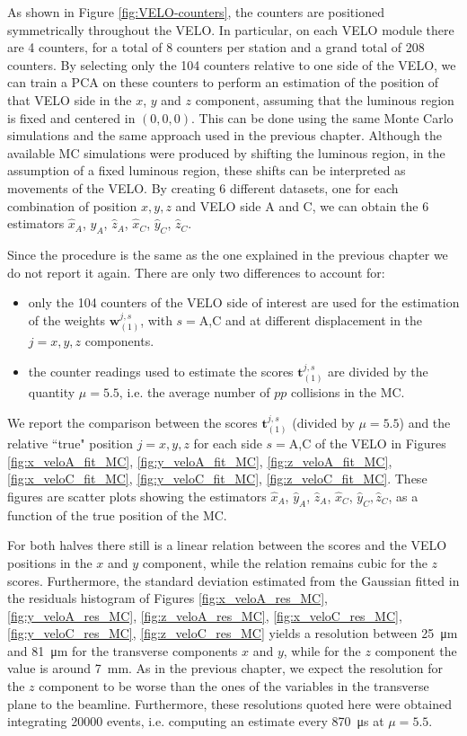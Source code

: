As shown in Figure \ref{fig:VELO-counters}, the counters are positioned symmetrically throughout the VELO. In particular, on each VELO module there are 4 counters, for a total of 8 counters per station and a grand total of 208 counters. By selecting only the 104 counters relative to one side of the VELO, we can train a PCA on these counters to perform an estimation of the position of that VELO side in the $x$, $y$ and $z$ component, assuming that the luminous region is fixed and centered in $(0,0,0)$. This can be done using the same Monte Carlo simulations and the same approach used in the previous chapter. Although the available MC simulations were produced by shifting the luminous region, in the assumption of a fixed luminous region, these shifts can be interpreted as movements of the VELO. By creating 6 different datasets, one for each combination of position $x,y,z$ and VELO side A and C, we can obtain the 6 estimators $\hat{x}_A$, $\hat{y}_A$, $\hat{z}_A$, $\hat{x}_C$, $\hat{y}_C$, $\hat{z}_C$.  

Since the procedure is the same as the one explained in the previous chapter we do not report it again. There are only two differences to account for:
\begin{itemize}
    \item only the 104 counters of the VELO side of interest are used for the estimation of the weights $\mathbf{w}^{j,s}_{(1)}$, with $s=$A,C and at different displacement in the $j=x,y,z$ components.
    \item the counter readings used to estimate the scores $\mathbf{t}^{j,s}_{(1)}$ are divided by the quantity $\mu=5.5$, i.e. the average number of $pp$ collisions in the MC.
\end{itemize}
We report the comparison between the scores $\mathbf{t}^{j,s}_{(1)}$ (divided by $\mu=5.5$) and the relative ``true" position $j=x,y,z$ for each side $s=$A,C of the VELO in Figures \ref{fig:x_veloA_fit_MC}, \ref{fig:y_veloA_fit_MC}, \ref{fig:z_veloA_fit_MC}, \ref{fig:x_veloC_fit_MC}, \ref{fig:y_veloC_fit_MC}, \ref{fig:z_veloC_fit_MC}. These figures are scatter plots showing the estimators $\hat{x}_A$, $\hat{y}_A$, $\hat{z}_A$, $\hat{x}_C$, $\hat{y}_C$$, \hat{z}_C$,  as a function of the true position of the MC.

For both halves there still is a linear relation between the scores and the VELO positions in the $x$ and $y$ component, while the relation remains cubic for the $z$ scores.  Furthermore, the standard deviation estimated from the Gaussian fitted in the residuals histogram of Figures \ref{fig:x_veloA_res_MC}, \ref{fig:y_veloA_res_MC}, \ref{fig:z_veloA_res_MC}, \ref{fig:x_veloC_res_MC}, \ref{fig:y_veloC_res_MC}, \ref{fig:z_veloC_res_MC} yields a resolution between \SI{25}{\micro\meter} and \SI{81}{\micro\meter} for the transverse components $x$ and $y$, while for the $z$ component the value is around \SI{7}{\milli\meter}. As in the previous chapter, we expect the resolution for the $z$ component to be worse than the ones of the variables in the transverse plane to the beamline. Furthermore, these resolutions quoted here were obtained integrating 20000 events, i.e. computing an estimate every \SI{870}{\micro\second} at $\mu=5.5$.


